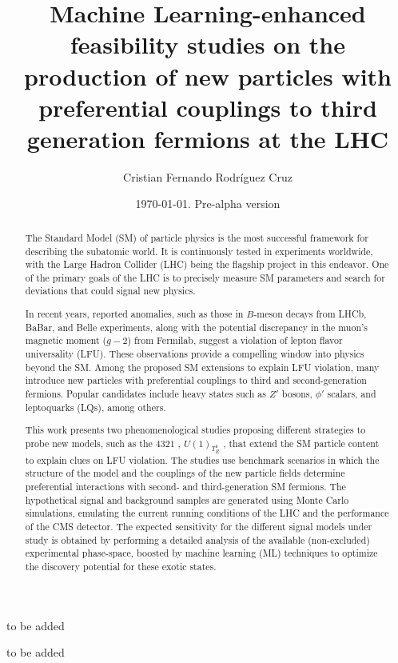 \documentclass[11pt, letterpaper]{book}%
\title{Machine Learning-enhanced feasibility studies on the production of new particles with preferential couplings to third generation fermions at the LHC}
\author{Cristian Fernando Rodríguez Cruz}
\date{\today. Pre-alpha version}
\begin{document}
\frontmatter

\maketitle

\begin{abstract}
The Standard Model (SM) of particle physics is the most successful framework for describing the subatomic world. It is continuously tested in experiments worldwide, with the Large Hadron Collider (LHC) being the flagship project in this endeavor. One of the primary goals of the LHC is to precisely measure SM parameters and search for deviations that could signal new physics.  

In recent years, reported anomalies, such as those in $B$-meson decays from LHCb, BaBar, and Belle experiments, along with the potential discrepancy in the muon's magnetic moment ($g-2$) from Fermilab, suggest a violation of lepton flavor universality (LFU). These observations provide a compelling window into physics beyond the SM. Among the proposed SM extensions to explain LFU violation, many introduce new particles with preferential couplings to third and second-generation fermions. Popular candidates include heavy states such as $Z'$ bosons, $\phi'$ scalars, and leptoquarks (LQs), among others.

This work presents two phenomenological studies proposing different strategies to probe new models, such as the $4321$ \cite{Florez2023}, $U(1)_{T^3_R}$ \cite{Qureshi:2024naw}, that extend the SM particle content to explain clues on LFU violation. The studies use benchmark scenarios in which the structure of the model and the couplings of the new particle fields determine preferential interactions with second- and third-generation SM fermions. The hypothetical signal and background samples are generated using Monte Carlo simulations, emulating the current running conditions of the LHC and the performance of the CMS detector. The expected sensitivity for the different signal models under study is obtained by performing a detailed analysis of the available (non-excluded) experimental phase-space, boosted by  machine learning (ML) techniques to optimize the discovery potential for these exotic states.
\end{abstract}

\begin{dedication}
to be added
\end{dedication}

\begin{acknowledgements}
to be added
\end{acknowledgements}
\end{document}
